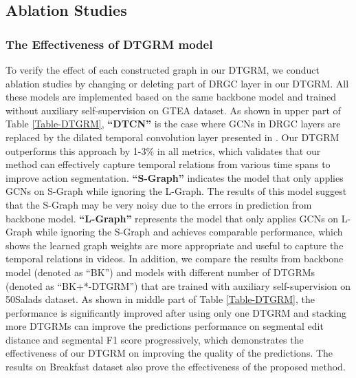 \documentclass[letterpaper]{article} \usepackage{aaai21}  \usepackage{times}  \usepackage{helvet} \usepackage{courier}  \usepackage[hyphens]{url}  \usepackage{graphicx} \usepackage{mathtools}
\begin{document}
\subsection{Ablation Studies}
\subsubsection{The Effectiveness of DTGRM model}
To verify the effect of each constructed graph in our DTGRM, we conduct ablation studies by changing or deleting part of DRGC layer in our DTGRM. All these models are implemented based on the same backbone model and trained without auxiliary self-supervision on GTEA dataset. As shown in upper part of Table \ref{Table-DTGRM}, \textbf{``DTCN''} is the case where GCNs in DRGC layers are replaced by the dilated temporal convolution layer presented in \cite{farha2019ms}. Our DTGRM outperforms this approach by 1-3\% in all metrics, which validates that our method can effectively capture temporal relations from various time spans to improve action segmentation. \textbf{``S-Graph''} indicates the model that only applies GCNs on S-Graph while ignoring the L-Graph. The results of this model suggest that the S-Graph may be very noisy due to the errors in prediction from backbone model. \textbf{``L-Graph''} represents the model that only applies GCNs on L-Graph while ignoring the S-Graph and achieves comparable performance, which shows the learned graph weights are more appropriate and useful to capture the temporal relations in videos. In addition, we compare the results from backbone model (denoted as ``BK'') and models with different number of DTGRMs (denoted as ``BK+*-DTGRM'') that are trained with auxiliary self-supervision on 50Salads dataset. As shown in middle part of Table \ref{Table-DTGRM}, the performance is significantly improved after using only one DTGRM and stacking more DTGRMs can improve the predictions performance on segmental edit distance and segmental F1 score progressively, which demonstrates the effectiveness of our DTGRM on improving the quality of the predictions. The results on Breakfast dataset also prove the effectiveness of the proposed method.   
\end{document}
